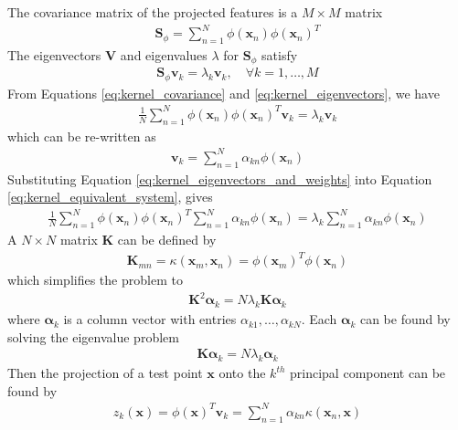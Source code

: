 \noindent
The covariance matrix of the projected features is a $M \times M$ matrix 
\begin{align} 
	\label{eq:kernel_covariance}
	\bm{S}_{\phi} =  \sum_{n=1}^{N}\phi(\bm{x}_{n})\phi(\bm{x}_{n})^{T}
\end{align}
\noindent
The eigenvectors $\bm{V}$ and eigenvalues $\lambda$ for $\bm{S}_{\phi}$ satisfy
\begin{align} 
	\label{eq:kernel_eigenvectors}
	\bm{S}_{\phi}\bm{v}_{k} = \lambda_{k} \bm{v}_{k}, \quad \forall k = 1, \dots, M
\end{align}
\noindent
From Equations \ref{eq:kernel_covariance} and \ref{eq:kernel_eigenvectors}, we have 
\begin{align}
	\label{eq:kernel_equivalent_system}
	\frac{1}{N} \sum_{n=1}^{N}\phi(\bm{x}_{n})\phi(\bm{x}_{n})^{T}\bm{v}_{k} = \lambda_{k} \bm{v}_{k}
\end{align}
\noindent
which can be re-written as
\begin{align}
	\label{eq:kernel_eigenvectors_and_weights}
	\bm{v}_{k} = \sum_{n=1}^{N}\alpha_{kn}\phi(\bm{x}_{n})
\end{align}
\noindent
Substituting Equation \ref{eq:kernel_eigenvectors_and_weights} into Equation \ref{eq:kernel_equivalent_system}, gives 
\begin{align}
	\frac{1}{N} \sum_{n=1}^{N}\phi(\bm{x}_{n})\phi(\bm{x}_{n})^{T}\sum_{n=1}^{N}\alpha_{kn}\phi(\bm{x}_{n}) = \lambda_{k} \sum_{n=1}^{N}\alpha_{kn}\phi(\bm{x}_{n})
\end{align}
\noindent
A $N \times N$ matrix $\bm{K}$ can be defined by 
\begin{align}
	\bm{K}_{mn} = \kappa(\bm{x}_{m},\bm{x}_{n}) = \phi(\bm{x}_{m})^{T}\phi(\bm{x}_{n})
\end{align}
\noindent
which simplifies the problem to 
\begin{align}
	\bm{K}^{2}\bm{\alpha}_{k} = N \lambda_{k}\bm{K} \bm{\alpha}_{k}
\end{align}
\noindent
where $\bm{\alpha}_{k}$ is a column vector with entries $\alpha_{k1}, \dots, \alpha_{kN}$.  Each $\bm{\alpha}_{k}$ can be found by solving the eigenvalue problem 
\begin{align}
	\bm{K}\bm{\alpha}_{k} = N \lambda_{k}\bm{\alpha}_{k}
\end{align}
\noindent
Then the projection of a test point $\bm{x}$ onto the $k^{th}$ principal component can be found by
\begin{align}
	z_{k}(\bm{x}) = \phi(\bm{x})^{T}\bm{v}_{k} = \sum_{n=1}^{N} \alpha_{kn}\kappa(\bm{x}_{n},\bm{x})
\end{align}
